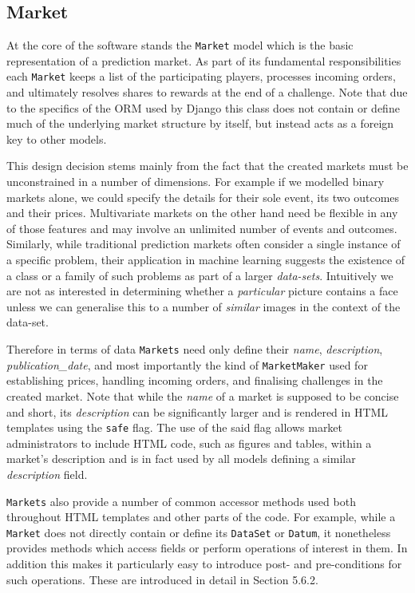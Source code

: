 \documentclass[bsc,frontabs,twoside,singlespacing,parskip,deptreport]{infthesis}     %
\begin{document}
\subsection{Market}
\label{sub:market}

    At the core of the software stands the {\tt Market} model which is the basic representation of a prediction market. As part of its fundamental responsibilities each {\tt Market} keeps a list of the participating players, processes incoming orders, and ultimately resolves shares to rewards at the end of a challenge. Note that due to the specifics of the ORM used by Django this class does not contain or define much of the underlying market structure by itself, but instead acts as a foreign key to other models. 

	This design decision stems mainly from the fact that the created markets must be unconstrained in a number of dimensions. For example if we modelled binary markets alone, we could specify the details for their sole event, its two outcomes and their prices. Multivariate markets on the other hand need be flexible in any of those features and may involve an unlimited number of events and outcomes. Similarly, while traditional prediction markets often consider a single instance of a specific problem, their application in machine learning suggests the existence of a class or a family of such problems as part of a larger {\em data-sets}. Intuitively we are not as interested in determining whether a {\em particular} picture contains a face unless we can generalise this to a number of {\em similar} images in the context of the data-set. 

	Therefore in terms of data {\tt Markets} need only define their {\em name}, {\em description}, {\em publication\_date}, and most importantly the kind of {\tt MarketMaker} used for establishing prices, handling incoming orders, and finalising challenges in the created market. Note that while the {\it name} of a market is supposed to be concise and short, its {\it description} can be significantly larger and is rendered in HTML templates using the {\tt safe} flag. The use of the said flag allows market administrators to include HTML code, such as figures and tables, within a market's description and is in fact used by all models defining a similar {\it description} field. 

	{\tt Markets} also provide a number of common accessor methods used both throughout HTML templates and other parts of the code. For example, while a {\tt Market} does not directly contain or define its {\tt DataSet} or {\tt Datum}, it nonetheless provides methods which access fields or perform operations of interest in them. In addition this makes it particularly easy to introduce post- and pre-conditions for such operations. These are introduced in detail in Section 5.6.2. 
    
\end{document}
